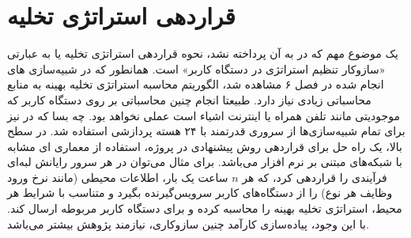 \section{قراردهی استراتژی تخلیه}
یک موضوع مهم که در \CurrentProject به آن پرداخته نشد، نحوه قراردهی استراتژی تخلیه یا به عبارتی «سازوکار تنظیم استراتژی در دستگاه کاربر» است. همانطور که در شبیه‌سازی های انجام شده در فصل ۶ مشاهده شد، الگوریتم محاسبه استراتژی تخلیه بهینه به منابع محاسباتی زیادی نیاز دارد. طبیعتا انجام چنین محاسباتی بر روی دستگاه کاربر که موجودیتی مانند تلفن همراه یا اینترنت اشیاء است عملی نخواهد بود. چه بسا که در \CurrentProject نیز برای تمام شبیه‌سازی‌ها از سروری قدرتمند با ۲۴ هسته پردازشی استفاده شد. در سطح بالا، یک راه حل برای قراردهی روش پیشنهادی در پروژه، استفاده از معماری ای مشابه با شبکه‌های مبتنی بر نرم افزار می‌باشد. برای مثال می‌توان در هر سرور رایانش لبه‌ای فرآیندی را قراردهی کرد، که هر $n$ ساعت یک بار، اطلاعات محیطی (مانند نرخ ورود وظایف هر نوع) را از دستگاه‌های کاربر سرویس‌گیرنده بگیرد و متناسب با شرایط هر محیط، استراتژی تخلیه بهینه را محاسبه کرده و برای دستگاه کاربر مربوطه ارسال کند. با این وجود، پیاده‌سازی کارآمد چنین سازوکاری، نیازمند پژوهش بیشتر می‌باشد.
\clearpage